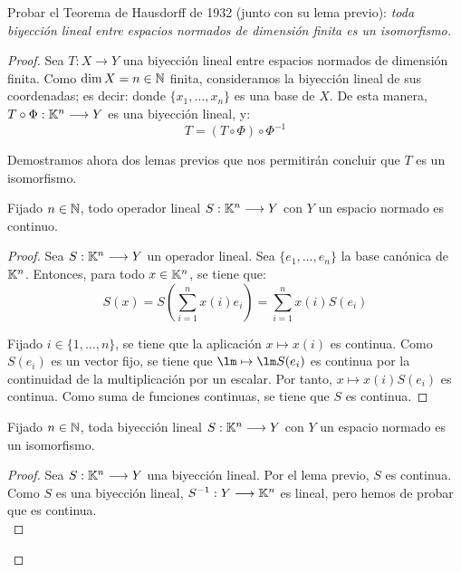 \documentclass[12pt]{article}
\begin{document}
    \begin{ejercicio}[5 puntos]
        Probar el Teorema de Hausdorff de 1932 (junto con su lema previo): \textit{toda biyección lineal entre espacios normados de dimensión finita es un isomorfismo.}

        \begin{proof}
            Sea $T:X\to Y$ una biyección lineal entre espacios normados de dimensión finita. Como $\dim X=n\in \mathbb{N}$ finita, consideramos la biyección lineal de sus coordenadas; es decir:
            donde $\{x_1, \dots, x_n\}$ es una base de $X$. De esta manera, $T\circ \Phi: \mathbb{K}^n \longrightarrow Y$ es una biyección lineal, y:
            \begin{equation*}
                T = (T\circ \Phi) \circ \Phi^{-1}
            \end{equation*}

            Demostramos ahora dos lemas previos que nos permitirán concluir que $T$ es un isomorfismo.
            \begin{lema}
                Fijado $n\in \mathbb{N}$, todo operador lineal $S:\mathbb{K}^n \longrightarrow Y$ con $Y$ un espacio normado es continuo.
            \end{lema}
            \begin{proof}
                Sea $S:\mathbb{K}^n \longrightarrow Y$ un operador lineal. Sea $\{e_1, \dots, e_n\}$ la base canónica de $\mathbb{K}^n$. Entonces, para todo $x\in \mathbb{K}^n$, se tiene que:
                \begin{equation*}
                    S(x) = S\left(\sum_{i=1}^n x(i) e_i\right) = \sum_{i=1}^n x(i) S(e_i)
                \end{equation*}

                Fijado $i\in \{1, \dots, n\}$, se tiene que la aplicación $x \longmapsto x(i)$ es continua. Como $S(e_i)$ es un vector fijo, se tiene que $\lm \mapsto \lm S(e_i)$ es continua por la continuidad de la multiplicación por un escalar. Por tanto, $x \longmapsto x(i) S(e_i)$ es continua. Como suma de funciones continuas, se tiene que $S$ es continua.
            \end{proof}
            \begin{lema}
                Fijado $n\in \mathbb{N}$, toda biyección lineal $S:\mathbb{K}^n \longrightarrow Y$ con $Y$ un espacio normado es un isomorfismo.
            \end{lema}
            \begin{proof}
                Sea $S:\mathbb{K}^n \longrightarrow Y$ una biyección lineal. Por el lema previo, $S$ es continua. Como $S$ es una biyección lineal, $S^{-1}:Y \longrightarrow \mathbb{K}^n$ es lineal, pero hemos de probar que es continua.\\


\end{proof}
\end{proof}
\end{ejercicio}
\end{document}
